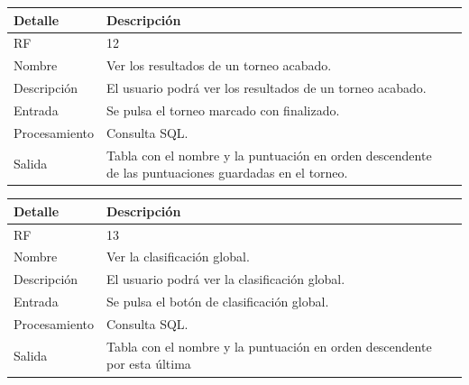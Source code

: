 \documentclass{article}
\begin{document}
\begin{table}[h!]
  \begin{center}
    \begin{tabularx}{\linewidth}{|X|X|X|} %
      \hline
      \textbf{Detalle} & \textbf{Descripción}\\
      \hline
      RF & 12 \\
      \hline
      Nombre & Ver los resultados de un torneo acabado.\\
      \hline
      Descripción & El usuario podrá ver los resultados de un torneo acabado.\\
      \hline
      Entrada & Se pulsa el torneo marcado con finalizado.\\
      \hline
      Procesamiento &  Consulta SQL.\\
      \hline
      Salida & Tabla con el nombre y la puntuación en orden descendente de las puntuaciones guardadas en el torneo.\\
      \hline
    \end{tabularx}
  \end{center}
\end{table}

\begin{table}[H]
  \begin{center}
    \begin{tabularx}{\linewidth}{|X|X|X|} %
      \hline
      \textbf{Detalle} & \textbf{Descripción}\\
      \hline
      RF & 13 \\
      \hline
      Nombre & Ver la clasificación global.\\
      \hline
      Descripción & El usuario podrá ver la clasificación global.\\
      \hline
      Entrada & Se pulsa el botón de clasificación global.\\
      \hline
      Procesamiento & Consulta SQL.\\
      \hline
      Salida & Tabla con el nombre y la puntuación en orden descendente por esta última\\
      \hline
    \end{tabularx}
  \end{center}
\end{table}
\end{document}
